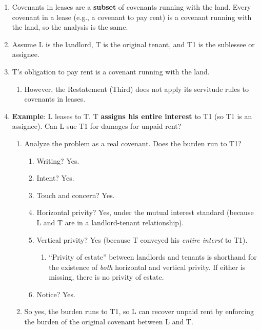 \begin{enumerate}
    \item Covenants in leases are a \textbf{subset} of covenants running with 
    the land. Every covenant in a lease (e.g., a covenant to pay rent) is a 
    covenant running with the land, so the analysis is the same.
    \item Assume L is the landlord, T is the original tenant, and T1 is the 
    sublessee or assignee.
    \item T's obligation to pay rent is a covenant running with the land.
    \begin{enumerate}
        \item However, the Restatement (Third) does not apply its servitude 
        rules to covenants in leases.
    \end{enumerate}
    \item \textbf{Example}: L leases to T. T \textbf{assigns his entire 
    interest} to T1 (so T1 is an assignee). Can L sue T1 for damages for 
    unpaid rent?
    \begin{enumerate}
        \item Analyze the problem as a real covenant. Does the burden run to 
        T1?
        \begin{enumerate}
            \item Writing? Yes.
            \item Intent? Yes.
            \item Touch and concern? Yes.
            \item Horizontal privity? Yes, under the mutual interest standard 
            (because L and T are in a landlord-tenant relationship).
            \item Vertical privity? Yes (because T conveyed his \emph{entire 
            interst} to T1).
            \begin{enumerate}
                \item ``Privity of estate'' between landlords and tenants is 
                shorthand for the existence of \emph{both} horizontal and 
                vertical privity. If either is missing, there is no privity of 
                estate.
            \end{enumerate}
            \item Notice? Yes.
        \end{enumerate}
        \item So yes, the burden runs to T1, so L can recover unpaid rent by 
        enforcing the burden of the original covenant between L and T.

\end{enumerate}
\end{enumerate}
